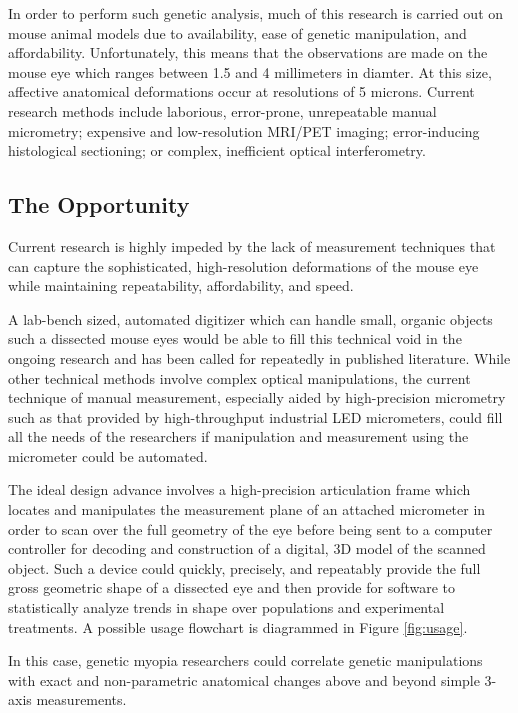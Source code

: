 \documentclass{article}
\begin{document}
In order to perform such genetic analysis, much of this research is carried out on mouse animal models due to availability, ease of genetic manipulation, and affordability\cite{schaeffel04}. Unfortunately, this means that the observations are made on the mouse eye which ranges between 1.5 and 4 millimeters in diamter. At this size, affective
anatomical deformations occur at resolutions of 5 microns. Current
research methods include laborious, error-prone, unrepeatable manual
micrometry\cite{wallman04}; expensive and low-resolution MRI/PET
imaging\cite{atchison04}; error-inducing histological
sectioning\cite{schaeffel04}; or complex, inefficient optical
interferometry\cite{schaeffel04,guggenheim04}.

\subsection{The Opportunity}
\label{sec:opportunity}

Current research is highly impeded by the lack of measurement
techniques that can capture the sophisticated, high-resolution
deformations of the mouse eye while
maintaining repeatability, affordability, and speed.

A lab-bench sized, automated digitizer which can handle small, organic objects such a dissected mouse eyes would be able to fill this technical void in the ongoing research and has been called for repeatedly in published literature\cite{schaeffel04,atchison04,zhou99:genes,zhou99:models}. While other technical methods involve complex optical manipulations, the current technique of manual measurement, especially aided by high-precision micrometry such as that provided by high-throughput industrial LED micrometers, could fill all the needs of the researchers if manipulation and measurement using the micrometer could be automated.

The ideal design advance involves a high-precision articulation frame
which locates and manipulates the measurement plane of an attached
micrometer in order to scan over the full geometry of the eye before
being sent to a computer controller for decoding and construction of a
digital, 3D model of the scanned object. Such a device could quickly,
precisely, and repeatably provide the full gross geometric shape of a
dissected eye and then provide for software to statistically analyze
trends in shape over populations and experimental treatments. A possible usage flowchart is diagrammed in Figure \ref{fig:usage}.

In this case, genetic myopia researchers could correlate genetic
manipulations with exact and non-parametric anatomical changes above
and beyond simple 3-axis measurements.
\end{document}
